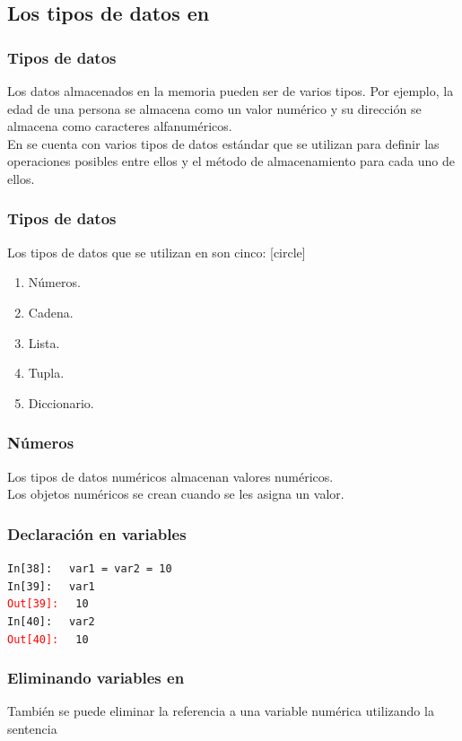 {\subsection{Los tipos de datos en \python}
\begin{frame}
\frametitle{Tipos de datos}
Los datos almacenados en la memoria pueden ser de varios tipos. Por ejemplo, la edad de una persona se almacena como un valor numérico y su dirección se almacena como caracteres alfanuméricos.
\\
\bigskip
En \python{} se cuenta con varios tipos de datos estándar que se utilizan para definir las operaciones posibles entre ellos y el método de almacenamiento para cada uno de ellos.
\end{frame}
\begin{frame}
\frametitle{Tipos de datos}
Los tipos de datos que se utilizan en \python{} son cinco:
[circle]
\begin{enumerate}[<+->]
\item Números.
\item Cadena.
\item Lista.
\item Tupla.
\item Diccionario.
\end{enumerate}
\end{frame}
\begin{frame}
\frametitle{Números}
Los tipos de datos numéricos almacenan valores numéricos.
\\
\bigskip
Los objetos numéricos se crean cuando se les asigna un valor.
\end{frame}
\begin{frame}[fragile]
\frametitle{Declaración en variables}
\textcolor{ao}{\texttt{In[38]: }} \verb| var1 = var2 = 10| \\
\pause
\textcolor{ao}{\texttt{In[39]: }} \verb| var1| \\
\pause
\textcolor{red}{\texttt{Out[39]: }} \verb| 10| \\
\pause
\textcolor{ao}{\texttt{In[40]: }} \verb| var2| \\
\pause
\textcolor{red}{\texttt{Out[40]: }} \verb| 10|
\end{frame}
\begin{frame}
\frametitle{Eliminando variables en \python}
También se puede eliminar la referencia a una variable numérica utilizando la sentencia 
\\
\bigskip

\end{frame}}
